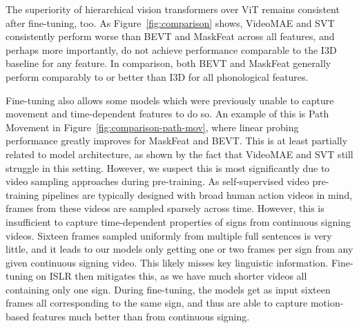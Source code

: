 The superiority of hierarchical vision transformers over ViT remains consistent after fine-tuning, too. As Figure~\ref{fig:comparison} shows, VideoMAE and SVT consistently perform worse than BEVT and MaskFeat across all features, and perhaps more importantly, do not achieve performance comparable to the I3D baseline for any feature. In comparison, both BEVT and MaskFeat generally perform comparably to or better than I3D for all phonological features.

Fine-tuning also allows some models which were previously unable to capture movement and time-dependent features to do so. An example of this is Path Movement in Figure~\ref{fig:comparison-path-mov}, where linear probing performance greatly improves for MaskFeat and BEVT. This is at least partially related to model architecture, as shown by the fact that VideoMAE and SVT still struggle in this setting. However, we suspect this is most significantly due to video sampling approaches during pre-training. As self-supervised video pre-training pipelines are typically designed with broad human action videos in mind, frames from these videos are sampled sparsely across time. However, this is insufficient to capture time-dependent properties of signs from continuous signing videos. Sixteen frames sampled uniformly from multiple full sentences is very little, and it leads to our models only getting one or two frames per sign from any given continuous signing video. This likely misses key linguistic information. Fine-tuning on ISLR then mitigates this, as we have much shorter videos all containing only one sign. During fine-tuning, the models get as input sixteen frames all corresponding to the same sign, and thus are able to capture motion-based features much better than from continuous signing.
